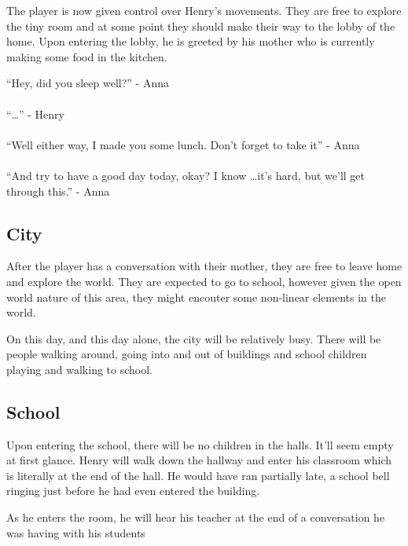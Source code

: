 \documentclass[12pt, a4paper, titlepage]{article}
\begin{document}
            The player is now given control over Henry's movements. They are free to explore the tiny room and at some point
            they should make their way to the lobby of the home. Upon entering the lobby, he is greeted by his mother who is
            currently making some food in the kitchen.

            ``Hey, did you sleep well?'' - Anna\\~\\
            ``\ldots'' - Henry\\~\\
            ``Well either way, I made you some lunch. Don't forget to take it'' - Anna\\~\\
            ``And try to have a good day today, okay? I know \ldots it's hard, but we'll get through this.'' - Anna

        \subsection{City}

            After the player has a conversation with their mother, they are free to leave home and explore the world. They are
            expected to go to school, however given the open world nature of this area, they might encouter some non-linear elements in the
            world.

            On this day, and this day alone, the city will be relatively busy. There will be people walking around, going into and out of buildings and school children
            playing and walking to school.

        \subsection{School}

            Upon entering the school, there will be no children in the halls. It'll seem empty at first glance. Henry will walk down the hallway and enter 
            his classroom which is literally at the end of the hall. He would have ran partially late, a school bell ringing just before he had even entered the building.
            
            As he enters the room, he will hear his teacher at the end of a conversation he was having with his students\\
            
\end{document}
